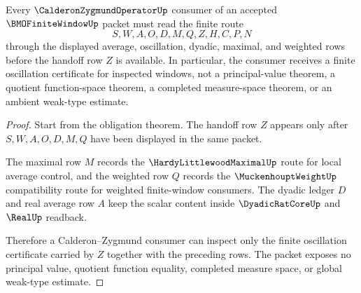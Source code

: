 \begin{theorem}
\label{thm:bmo-finite-window-calderon-zygmund-handoff}
Every $\CalderonZygmundOperatorUp$ consumer of an accepted $\BMOFiniteWindowUp$ packet must read the finite route
$$
S,W,A,O,D,M,Q,Z,H,C,P,N
$$
through the displayed average, oscillation, dyadic, maximal, and weighted rows before the handoff row $Z$ is available. In particular, the consumer receives a finite oscillation certificate for inspected windows, not a principal-value theorem, a quotient function-space theorem, a completed measure-space theorem, or an ambient weak-type estimate.
\end{theorem}
\begin{proof}
Start from the obligation theorem. The handoff row $Z$ appears only after $S,W,A,O,D,M,Q$ have been displayed in the same packet.

The maximal row $M$ records the $\HardyLittlewoodMaximalUp$ route for local average control, and the weighted row $Q$ records the $\MuckenhouptWeightUp$ compatibility route for weighted finite-window consumers. The dyadic ledger $D$ and real average row $A$ keep the scalar content inside $\DyadicRatCoreUp$ and $\RealUp$ readback.

Therefore a Calderon--Zygmund consumer can inspect only the finite oscillation certificate carried by $Z$ together with the preceding rows. The packet exposes no principal value, quotient function equality, completed measure space, or global weak-type estimate.
\end{proof}




